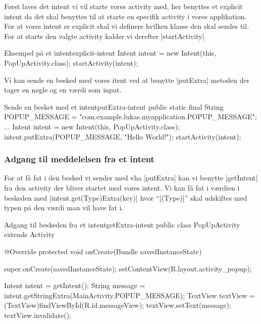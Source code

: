 Først laves det intent vi vil starte vores activity med, her benyttes et explicit intent da det skal benyttes til at starte en specifik activity i vores applikation. For at vores intent er explicit skal vi definere hvilken klasse den skal sendes til. For at starte den valgte activity kalder vi derefter \JavaInline|startActivity|.

\begin{example}\noindent
	\begin{JavaCode}{Eksempel på et intent}{explicit-intent}
		Intent intent = new Intent(this, PopUpActivity.class);
		startActivity(intent);
	\end{JavaCode}
\end{example}

Vi kan sende en besked med vores itent ved at benytte \JavaInline|putExtra| metoden der tager en nøgle og en værdi som input.

\begin{example}\noindent
	\begin{JavaCode}{Sende en besket med et intent}{putExtra-intent}
		public static final String POPUP_MESSAGE = "com.example.lukas.myapplication.POPUP_MESSAGE";
		...
		Intent intent = new Intent(this, PopUpActivity.class);
		intent.putExtra(POPUP_MESSAGE, "Hello World!");
		startActivity(intent);
	\end{JavaCode}
\end{example}

\subsubsection{Adgang til meddelelsen fra et intent}

For at få fat i den besked vi sender med vha \JavaInline|putExtra| kan vi benytte \JavaInline|getIntent| fra den activity der bliver startet med vores intent. Vi kan få fat i værdien i beskeden med \JavaInline|intent.get(Type)Extra(key)|  hvor ``\JavaInline|(Type)|'' skal udskiftes med typen på den værdi man vil have fat i.

\begin{example}\noindent
	\begin{JavaCode}{Adgang til beskeden fra et intent}{getExtra-intent}
		public class PopUpActivity extends Activity {
			
			@Override
			protected void onCreate(Bundle savedInstanceState) {
				super.onCreate(savedInstanceState);
				setContentView(R.layout.activity_popup);
				
				Intent intent = getIntent();
				String message = intent.getStringExtra(MainActivity.POPUP_MESSAGE);
				TextView textView = (TextView)findViewById(R.id.messageView);
				textView.setText(message);
				textView.invalidate();
			}
		}
	\end{JavaCode}
\end{example}

